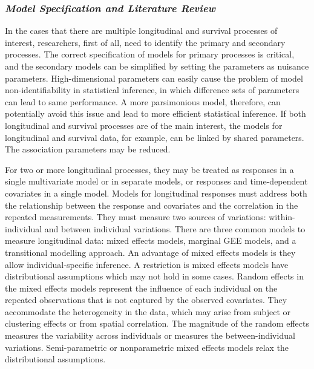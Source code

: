 \subsubsection*{\textit{Model Specification and Literature Review}}

In the cases that there are multiple longitudinal and survival processes of interest, researchers, first of all, need to identify the primary and secondary processes. The correct specification of models for primary processes is critical, and the secondary models can be simplified by setting the parameters as nuisance parameters. High-dimensional parameters can easily cause the problem of model non-identifiability in statistical inference, in which difference sets of parameters can lead to same performance. A more parsimonious model, therefore, can potentially avoid this issue and lead to more efficient statistical inference. 
If both longitudinal and survival processes are of the main interest, the models for longitudinal and survival data, for example, can be linked by shared parameters. The association parameters may be reduced.

%
For two or more longitudinal processes, they may be treated as responses in a single multivariate model or in separate models, or responses and time-dependent covariates in a single model. 
Models for longitudinal responses must address both the relationship between the response and covariates and the correlation in the repeated measurements. They must measure two sources of variations: within-individual and between individual variations. There are three common models to measure longitudinal data: mixed effects models, marginal GEE models, and a transitional modelling approach. An advantage of mixed effects models is they allow individual-specific inference. A restriction is mixed effects models have distributional assumptions which may not hold in some cases. Random effects in the mixed effects models represent the influence of each individual on the repeated observations that is not captured by the observed covariates. They accommodate the heterogeneity in the data, which may arise from subject or clustering effects or from spatial correlation. The magnitude of the random effects measures the variability across individuals or measures the between-individual variations.
Semi-parametric or nonparametric mixed effects models relax the distributional assumptions.

